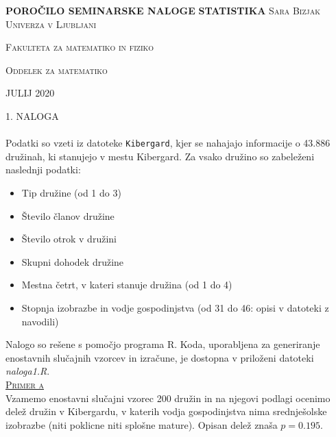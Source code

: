 \documentclass[a4paper,12pt]{article}
\begin{document}
\begin{titlepage}
    \centering
    \vfill
    \vfill
    \textbf{\large{POROČILO SEMINARSKE NALOGE}}
    \vfill
    \textbf{\Huge{STATISTIKA}}
    \vfill\vfill\vfill\vfill\vfill
    \textsc{\Large{Sara Bizjak}}
    \vfill\vfill
    \textsc{\large{Univerza v Ljubljani}}
    
    \textsc{\large{Fakulteta za matematiko in fiziko}}
    
    \textsc{\large{Oddelek za matematiko}}
    \vfill\vfill
        
    \large{JULIJ 2020}
    
\end{titlepage}


\newpage


\noindent
\textsc{\large{1. NALOGA}}
\\
\\
Podatki so vzeti iz datoteke \texttt{Kibergard}, kjer se nahajajo informacije o 43.886 družinah, ki stanujejo v mestu Kibergard. Za vsako družino so zabeleženi naslednji podatki:
\begin{itemize}
    \item Tip družine (od 1 do 3)
    \item Število članov družine
    \item Število otrok v družini
    \item Skupni dohodek družine
    \item Mestna četrt, v kateri stanuje družina (od 1 do 4)
    \item Stopnja izobrazbe in vodje gospodinjstva (od 31 do 46: opisi v datoteki z navodili)
\end{itemize}

\noindent
Nalogo so rešene s pomočjo programa R. Koda, uporabljena za generiranje enostavnih slučajnih vzorcev in izračune, je dostopna v priloženi datoteki \textit{naloga1.R}. 
\\


\noindent
\textsc{\underline{Primer a}}
\\
Vzamemo enostavni slučajni vzorec 200 družin in na njegovi podlagi ocenimo delež družin v Kibergardu, v katerih vodja gospodinjstva nima srednješolske izobrazbe (niti poklicne niti splošne mature).
Opisan delež znaša $p = 0.195$.
\\
\end{document}
